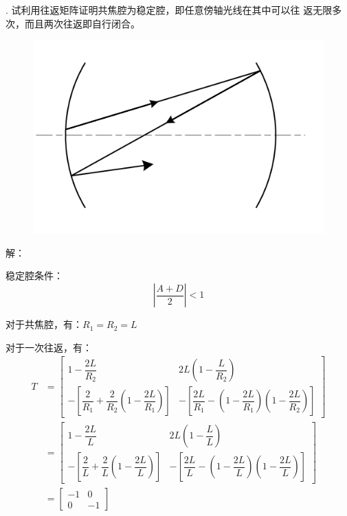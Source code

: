 \documentclass[12pt]{article}
\begin{document}
{. 试利用往返矩阵证明共焦腔为稳定腔，即任意傍轴光线在其中可以往
返无限多次，而且两次往返即自行闭合。
}
\begin{figure}[H]
	\centering
	\includegraphics[width=0.3\linewidth]{fig/1_new.png}
	\caption*{}%
\end{figure}
{\kaishu\noindent
 解：
 \par 稳定腔条件：
 \begin{equation*}
 	\left| \dfrac{A+D}{2}  \right|<1
 \end{equation*}
\par 对于共焦腔，有：$R_1=R_2=L$
\par 对于一次往返，有：
 \begin{align*}
	 T&=
\begin{bmatrix}
	1-\dfrac{2L}{R_2} & 2L \left( 1- \dfrac{L}{R_2}  \right)\\
	-\left[\dfrac{2}{R_1} + \dfrac{2}{R_2} \left( 1-\dfrac{2L}{R_1}  \right)\right]
	& 
	-\left[ \dfrac{2L}{R_1} -\left( 1-\dfrac{2L}{R_1}  \right)\left( 1-\dfrac{2L}{R_2}  \right) \right]
\end{bmatrix}
\\&=
\begin{bmatrix}
	1-\dfrac{2L}{L} & 2L \left( 1- \dfrac{L}{L}  \right)\\
	-\left[\dfrac{2}{L} + \dfrac{2}{L} \left( 1-\dfrac{2L}{L}  \right)\right]
	& 
	-\left[ \dfrac{2L}{L} -\left( 1-\dfrac{2L}{L}  \right)\left( 1-\dfrac{2L}{L}  \right) \right]
\end{bmatrix}
\\&=
\begin{bmatrix}
	-1 & 0 \\
	0 & -1
\end{bmatrix}
\\
 \end{align*}

}
\end{document}
